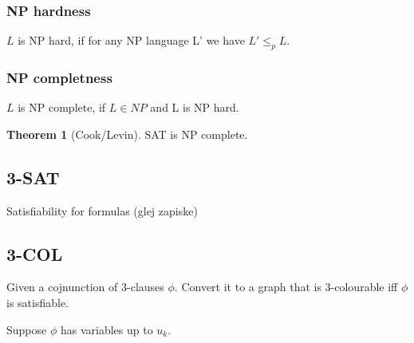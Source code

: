 \documentclass[a4paper,12pt]{article}
\theoremstyle{definition}
\newtheorem{theorem}[counter]{Theorem}
\theoremstyle{remark}
\begin{document}
\subsubsection*{NP hardness}

$L$ is NP hard, if for any NP language L' we have $L' \leq_p L$.

\subsubsection*{NP completness}

$L$ is NP complete, if $L \in NP$ and L is NP hard.

\begin{theorem}[Cook/Levin]
    SAT is NP complete.
\end{theorem}

\subsection{3-SAT}

Satisfiability for formulas (glej zapiske) %






\subsection{3-COL}

Given a cojnunction of 3-clauses $\phi$. Convert it to a graph that is 3-colourable iff $\phi$ is satisfiable.

Suppose $\phi$ has variables up to $u_k$.
\end{document}
